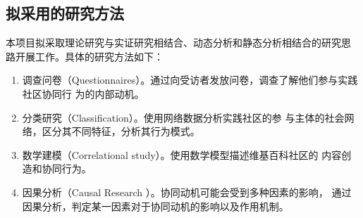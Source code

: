 \documentclass[12pt,a4paper,cs4size]{ctexart}
\begin{document}
\subsection{拟采用的研究方法}
本项目拟采取理论研究与实证研究相结合、动态分析和静态分析相结合的研究思
路开展工作。具体的研究方法如下：
\begin{enumerate}
\item  调查问卷（Questionnaires）。通过向受访者发放问卷，调查了解他们参与实践社区协同行
  为的内部动机。
\item 分类研究（Classification）。使用网络数据分析实践社区的参
  与主体的社会网络，区分其不同特征，分析其行为模式。
\item 数学建模（Correlational study）。使用数学模型描述维基百科社区的
  内容创造和协同行为。
\item 因果分析（Causal Research ）。协同动机可能会受到多种因素的影响，
  通过因果分析，判定某一因素对于协同动机的影响以及作用机制。
\end{enumerate}
\end{document}
